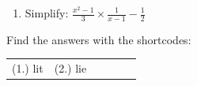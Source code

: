 \begin{enumerate}[noitemsep, label=\textbf{\arabic*}. ]
{\begin{center}
\begin{xtabular*}{\mytablewidth}[t]{|p{10\mystarwidth}|p{10\mystarwidth}|}
        (p) $\frac{{p}^{2}+pq}{7p}÷\frac{8p+8q}{21q}$\hspace{1ex}%
     \tabularnewline{}
        (q) $\frac{5ab-15b}{4a-12}÷\frac{6{b}^{2}}{a+b}$\hspace{1ex} &
        (r) $\frac{{f}^{2}a-f{a}^{2}}{f-a}$%
     \tabularnewline{}
    \end{xtabular*}
      \end{center}
    \begin{center}{\small\bfseries Table 8.11}\end{center}
        }%
    \par
          \label{m39392*uid54}\item Simplify: $\frac{{x}^{2}-1}{3}\ensuremath{\times}\frac{1}{x-1}-\frac{1}{2}$
\newline
\newline
\end{enumerate}
    \label{m39392*eip-770}
\par {} Find the answers with the shortcodes:
 \par \begin{tabular}[h]{cccccc}
 (1.) lit  &  (2.) lie  & \end{tabular}
